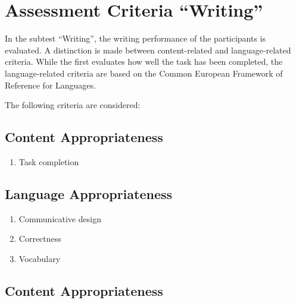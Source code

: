 \documentclass[a4paper,11pt]{article}
\begin{document}
    
    \section{Assessment Criteria ``Writing''}
        
        In the subtest ``Writing'', the writing performance of the participants is evaluated.
        A distinction is made between content-related and language-related criteria.
        While the first evaluates how well the task has been completed, the language-related
        criteria are based on the Common European Framework of Reference for Languages.
        
        The following criteria are considered:
        
        \subsection{Content Appropriateness}
            
            \begin{enumerate}
                \item Task completion
            \end{enumerate}
        
        \subsection{Language Appropriateness}
            
            \begin{enumerate}
                \item Communicative design
                \item Correctness
                \item Vocabulary
            \end{enumerate}
        
        \subsection{Content Appropriateness}
            
\end{document}
